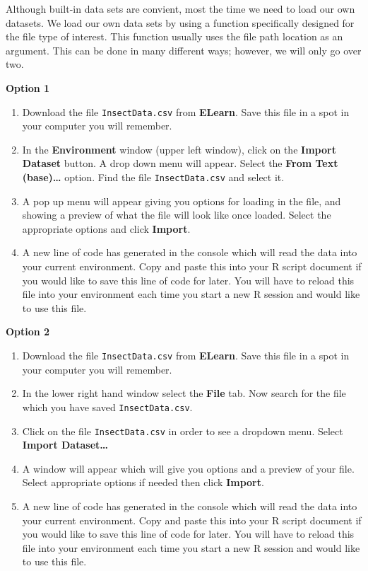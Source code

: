 \documentclass[
]{book}
\begin{document}
Although built-in data sets are convient, most the time we need to load our own datasets. We load our own data sets by using a function specifically designed for the file type of interest. This function usually uses the file path location as an argument. This can be done in many different ways; however, we will only go over two.

\textbf{Option 1}

\begin{enumerate}
\def\labelenumi{\arabic{enumi})}
\item
  Download the file \texttt{InsectData.csv} from \textbf{ELearn}. Save this file in a spot in your computer you will remember.
\item
  In the \textbf{Environment} window (upper left window), click on the \textbf{Import Dataset} button. A drop down menu will appear. Select the \textbf{From Text (base)\ldots{}} option. Find the file \texttt{InsectData.csv} and select it.
\item
  A pop up menu will appear giving you options for loading in the file, and showing a preview of what the file will look like once loaded. Select the appropriate options and click \textbf{Import}.
\item
  A new line of code has generated in the console which will read the data into your current environment. Copy and paste this into your R script document if you would like to save this line of code for later. You will have to reload this file into your environment each time you start a new R session and would like to use this file.
\end{enumerate}

\textbf{Option 2}

\begin{enumerate}
\def\labelenumi{\arabic{enumi})}
\item
  Download the file \texttt{InsectData.csv} from \textbf{ELearn}. Save this file in a spot in your computer you will remember.
\item
  In the lower right hand window select the \textbf{File} tab. Now search for the file which you have saved \texttt{InsectData.csv}.
\item
  Click on the file \texttt{InsectData.csv} in order to see a dropdown menu. Select \textbf{Import Dataset\ldots{}}
\item
  A window will appear which will give you options and a preview of your file. Select appropriate options if needed then click \textbf{Import}.
\item
  A new line of code has generated in the console which will read the data into your current environment. Copy and paste this into your R script document if you would like to save this line of code for later. You will have to reload this file into your environment each time you start a new R session and would like to use this file.
\end{enumerate}
\end{document}
